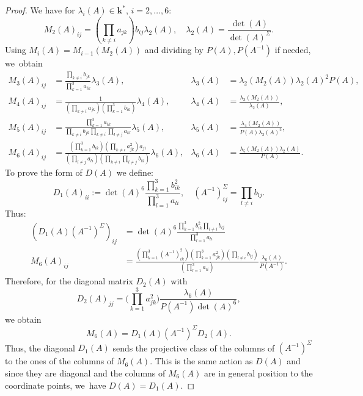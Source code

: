 \documentclass[JEP,XML,SOM,Unicode,NoFloatCountersInSection, NoEqCountersInSection,published]{cedram}
\theoremstyle{definition}
\newcommand{\kk}{{\boldsymbol{k}}}
\begin{document}
\begin{proof}
We have for $\lambda_i(A) \in \kk^*$, $i = 2, \dots , 6$:
\[
M_2(A)_{ij} = (\prod_{k \neq i} a_{jk}) b_{ij} \lambda_2(A),
\quad
\lambda_2(A) = \frac{\det(A)}{\det(A)^{\Sigma}}.
\]
Using $M_i(A) = M_{i-1}(M_2(A))$ and dividing by $P(A), P(A^{-1})$ if needed, we~obtain
\begin{align*}
M_3(A)_{ij} &= \frac{\prod_{k \neq i}b_{jk}}{\prod_{k = 1}^3a_{ik}} \lambda_3(A),&
\lambda_3(A) &= \lambda_2(M_2(A)) \lambda_2(A)^2P(A),
\\
M_4(A)_{ij} &= \frac{1}{(\prod_{k \neq i}a_{jk})(\prod_{k=1}^3 b_{ik})} \lambda_4(A),&
\lambda_4(A) &= \frac{\lambda_3(M_2(A))}{\lambda_2(A)},
\\
M_5(A)_{ij} &= \frac{\prod_{k=1}^3a_{ik}}{\prod_{k \neq i}b_{jk} \prod_{k \neq i} \prod_{l \neq j} a_{kl}} \lambda_5(A),&
\lambda_5(A) &= \frac{\lambda_4(M_2(A))}{P(A) \lambda_2(A)^2},
\\
M_6(A)_{ij} &= \frac{(\prod_{k=1}^3b_{ik}) (\prod_{k \neq i}a_{jk}^2)a_{ji}}{(\prod_{l \neq j}a_{li}) (\prod_{k \neq i} \prod_{l \neq j}b_{kl})} \lambda_6(A),&
\lambda_6(A) &= \frac{\lambda_5(M_2(A)) \lambda_2(A)}{P(A)}.
\end{align*}
To prove the form of $D(A)$ we define:
\[
D_1(A)_{ii} := \det(A)^6\frac{\prod_{k=1}^3b_{ik}^2}{\prod_{l=1}^3a_{li}},
\quad
(A^{-1})^{\Sigma}_{ij} = \prod_{l \neq i} b_{lj}.
\]
Thus:
\begin{align*}
(D_1(A)(A^{-1})^{\Sigma})_{ij} &= \det(A)^6\frac{\prod_{k=1}^3b_{ik}^2\prod_{l \neq i} b_{lj}}{\prod_{l=1}^3a_{li}}
\\
\tag*{and}
M_6(A)_{ij} &= \frac{(\prod_{k=1}^3(A^{-1})^2_{ik}) (\prod_{k = 1}^3a_{jk}^2)(\prod_{l \neq i}b_{lj})}{(\prod_{l = 1}^3a_{li})} \frac{\lambda_6(A)}{P(A^{-1})}.
\end{align*}
Therefore, for the diagonal matrix $D_2(A)$ with
\[
D_2(A)_{jj} = \biggl(\prod_{k=1}^3a_{jk}^2\biggr) \frac{\lambda_6(A)}{P(A^{-1})\det(A)^6},
\]
we obtain
\[
M_6(A) = D_1(A) (A^{-1})^{\Sigma}D_2(A).
\]
Thus, the diagonal $D_1(A)$ sends the projective class of the columns of $(A^{-1})^{\Sigma}$ to the ones of the columns of $M_6(A)$. This is the same action as $D(A)$ and since they are diagonal and the columns of $M_6(A)$ are in general position to the coordinate points, we~have $D(A) = D_1(A)$.
\end{proof}
\end{document}

